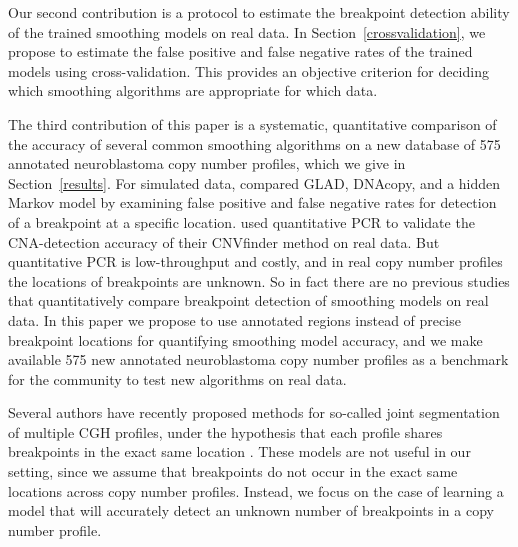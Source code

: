 \documentclass{bioinfo}
\newcommand{\model}[1]{#1}
\begin{document}
Our second contribution is a protocol to estimate the breakpoint
detection ability of the trained smoothing models on real data. In
Section~\ref{crossvalidation}, we propose to estimate the false
positive and false negative rates of the trained models using
cross-validation. This provides an objective criterion for deciding
which smoothing algorithms are appropriate for which data.

The third contribution of this paper is a systematic, quantitative
comparison of the accuracy of several common smoothing algorithms on a
new database of 575 annotated neuroblastoma copy number profiles,
which we give in Section~\ref{results}. For simulated data,
\cite{compare} compared GLAD, DNAcopy, and a hidden Markov model by
examining false positive and false negative rates for detection of a
breakpoint at a specific location. \cite{cnvfinder} used quantitative
PCR to validate the CNA-detection accuracy of their \model{CNVfinder}
method on real data. But quantitative PCR is low-throughput and
costly, and in real copy number profiles the locations of breakpoints
are unknown. So in fact there are no previous studies that
quantitatively compare breakpoint detection of smoothing models on
real data. In this paper we propose to use annotated regions instead
of precise breakpoint locations for quantifying smoothing model
accuracy, and we make available 575 new annotated neuroblastoma copy
number profiles as a benchmark for the community to test new
algorithms on real data.

Several authors have recently proposed methods for so-called joint
segmentation of multiple CGH profiles, under the hypothesis that each
profile shares breakpoints in the exact same location
\citep{jp-nips,nbc}. These models are not useful in our
setting, since we assume that breakpoints do not occur in the exact
same locations across copy number profiles. Instead, we focus on the
case of learning a model that will accurately detect an unknown number
of breakpoints in a copy number profile.
\end{document}
